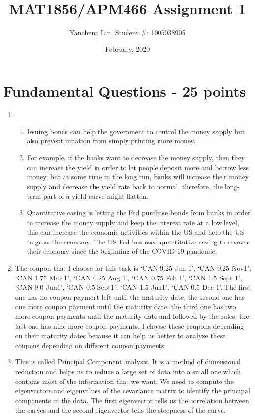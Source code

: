 \documentclass{article}
\title{MAT1856/APM466 Assignment 1}
\author{Yancheng Liu, Student \#: 1005038905}
\date{February, 2020}
\begin{document}
\maketitle

\section*{Fundamental Questions - 25 points}

\begin{enumerate}
    \item \hfill
    \begin{enumerate}
        \item Issuing bonds can help the government to control the money supply but also prevent inflation from simply printing more money. 

        \item For example, if the banks want to decrease the money supply, then they can increase the yield in order to let people deposit more and borrow less money, but at some time in the long run, banks will increase their money supply and decrease the yield rate back to normal, therefore, the long-term part of a yield curve might flatten. 

        \item Quantitative easing is letting the Fed purchase bonds from banks in order to increase the money supply and keep the interest rate at a low level, this can increase the economic activities within the US and help the US to grow the economy. The US Fed has used quantitative easing to recover their economy since the beginning of the COVID-19 pandemic.

    \end{enumerate}
    \item The coupon that I choose for this task is ‘CAN 9.25 Jun 1’, ‘CAN 0.25 Nov1’, ‘CAN 1.75 Mar 1’, ‘CAN 0.25 Aug 1’, ‘CAN 0.75 Feb 1’, ‘CAN 1.5 Sept 1’, ‘CAN 9.0 Jun1’, ‘CAN 0.5 Sept1’, ‘CAN 1.5 Jun1’, ‘CAN 0.5 Dec 1’. The first one has no coupon payment left until the maturity date, the second one has one more coupon payment until the maturity date, the third one has two more coupon payments until the maturity date and followed by the rules, the last one has nine more coupon payments. I choose these coupons depending on their maturity dates because it can help us better to analyze these coupons depending on different coupon payments.

    \item This is called Principal Component analysis. It is a method of dimensional reduction and helps us to reduce a large set of data into a small one which contains most of the information that we want. We need to compute the eigenvectors and eigenvalues of the covariance matrix to identify the principal components in the data. The first eigenvector tells us the correlation between the curves and the second eigenvector tells the steepness of the curve.

\end{enumerate}
\end{document}
